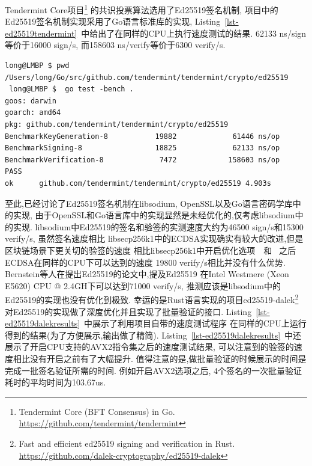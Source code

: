 Tendermint Core项目\footnote{
Tendermint Core (BFT Consensus) in Go.
\url{https://github.com/tendermint/tendermint}}
的共识投票算法选用了Ed25519签名机制,
项目中的Ed25519签名机制实现采用了Go语言标准库的实现,
Listing~\ref{lst-ed25519tendermint}~中给出了在同样的CPU上执行速度测试的结果.
62133 ns/sign等价于16000 sign/s, 而158603 ns/verify等价于6300 verify/s.

\begin{lstlisting}[caption=Ed25519 Speed in Tendermint, label=lst-ed25519tendermint]
 long@LMBP $ pwd
/Users/long/Go/src/github.com/tendermint/tendermint/crypto/ed25519
 long@LMBP $  go test -bench .
goos: darwin
goarch: amd64
pkg: github.com/tendermint/tendermint/crypto/ed25519
BenchmarkKeyGeneration-8           19882             61446 ns/op
BenchmarkSigning-8                 18825             62133 ns/op
BenchmarkVerification-8             7472            158603 ns/op
PASS
ok      github.com/tendermint/tendermint/crypto/ed25519 4.903s
\end{lstlisting}

至此,已经讨论了Ed25519签名机制在libsodium, OpenSSL以及Go语言密码学库中的实现,
由于OpenSSL和Go语言库中的实现显然是未经优化的,仅考虑libsodium中的实现.
libsodium中Ed25519的签名和验签的实测速度大约为46500 sign/s和15300 verify/s, 虽然签名速度相比
libsecp256k1中的ECDSA实现确实有较大的改进,但是区块链场景下更关切的验签的速度
相比libsecp256k1中开启优化选项~~和
~之后ECDSA在同样的CPU下可以达到的速度
19800 verify/s相比并没有什么优势. Bernstein等人在提出Ed25519的论文中,提及Ed25519
在Intel Westmere (Xeon E5620) CPU @ 2.4GH下可以达到71000 verify/s,
推测应该是libsodium中的Ed25519的实现也没有优化到极致.
幸运的是Rust语言实现的项目ed25519-dalek\footnote{
Fast and efficient ed25519 signing and verification in Rust.
\url{https://github.com/dalek-cryptography/ed25519-dalek}}
对Ed25519的实现做了深度优化并且实现了批量验证的接口.
Listing~\ref{lst-ed25519dalekresults}~中展示了利用项目自带的速度测试程序
在同样的CPU上运行得到的结果(为了方便展示,输出做了精简).
Listing~\ref{lst-ed25519dalekresults}~中还展示了开启CPU支持的AVX2指令集之后的速度测试结果,
可以注意到的验签的速度相比没有开启之前有了大幅提升.
值得注意的是,做批量验证的时候展示的时间是完成一批签名验证所需的时间.
例如开启AVX2选项之后, 4个签名的一次批量验证耗时的平均时间为103.67us.

